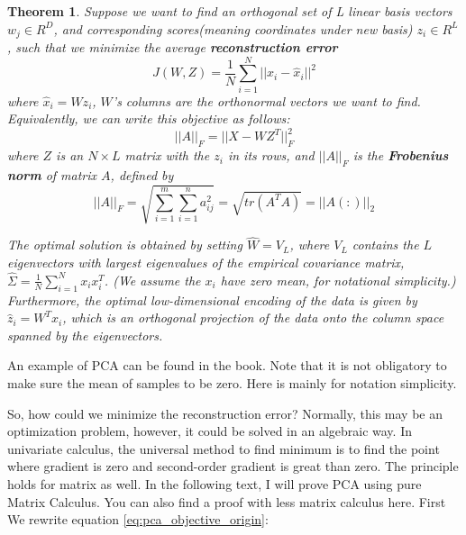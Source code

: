 \documentclass[a4paper]{book}
\newtheorem{theorem}{Theorem}[section]
\begin{document}
  \begin{theorem}
    Suppose we want to find an orthogonal set of L linear basis vectors
    $w_{j} \in R^{D}$, and corresponding scores(meaning coordinates
    under new basis) $z_{i} \in R^{L}$, such that we minimize the
    average \textbf{reconstruction error}
    \begin{equation}
      J(W, Z) = \frac{1}{N} \sum\limits^{N}_{i=1}||x_{i} -
      \hat{x}_{i}||^{2}
      \label{eq:pca_objective_origin}
    \end{equation}
    where $\hat{x}_{i} = Wz_{i}$, $W$'s columns are the orthonormal
    vectors we want to find. Equivalently, we can write this objective
    as follows:
    \begin{equation}
      ||A||_{F} = ||X - WZ^{T}||^{2}_{F}
    \end{equation}
    where $Z$ is an $N \times L$ matrix with the $z_{i}$ in its rows,
    and $||A||_{F}$ is the \textbf{Frobenius norm} of matrix $A$,
    defined by 
    \begin{equation}
      ||A||_{F} =
      \sqrt{\sum\limits^{m}_{i=1}\sum\limits^{n}_{i=1}a^{2}_{ij}} =
        \sqrt{tr(A^{T}A)} = 
        ||A(:)||_{2}
    \end{equation}

    The optimal solution is obtained by setting $\hat{W} = V_{L}$, where
    $V_{L}$ contains the $L$ eigenvectors with largest eigenvalues of
    the empirical covariance matrix, $\hat{\Sigma} =
    \frac{1}{N}\sum^{N}_{i=1}x_{i}x^{T}_{i}$. (We assume the $x_{i}$
    have zero mean, for notational simplicity.) Furthermore, the optimal
    low-dimensional encoding of the data is given by $\hat{z}_{i} =
    W^{T}x_{i}$, which is an orthogonal projection of the data onto the
    column space spanned by the eigenvectors.
  \end{theorem}

  An example of PCA can be found in the book\cite{murphy2012machine}.
  Note that it is not obligatory to make sure the mean of samples to be
  zero. Here is mainly for notation simplicity.

  So, how could we minimize the reconstruction error? Normally, this may
  be an optimization problem, however, it could be solved in an
  algebraic way. In univariate calculus, the universal method to find
  minimum is to find the point where gradient is zero and second-order
  gradient is great than zero. The principle holds for matrix as well.
  In the following text, I will prove PCA using pure Matrix Calculus.
  You can also find a proof with less matrix calculus
  here\cite{murphy2012machine}.
  First We rewrite equation \ref{eq:pca_objective_origin}:
\end{document}
